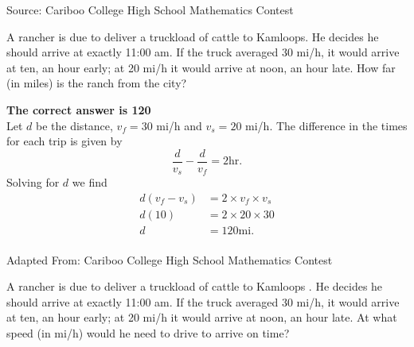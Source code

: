 \documentclass{article}
\begin{document}
\scriptsize
Source: Cariboo College High School Mathematics Contest

\normalsize
A rancher is due to deliver a truckload of cattle to Kamloops. He decides he should arrive at exactly 11:00 am. If the truck averaged 30 mi/h, it would arrive at ten, an hour early; at 20 mi/h it would arrive at noon, an hour late. How far (in miles) is the ranch from the city? 


\textbf{The correct answer is 120}\\[1 ex]
Let $d$ be the distance, $v_f=30$ mi/h and $v_s=20$ mi/h. The difference in the times for each trip is given by
\begin{equation*}
\frac{d}{v_s}-\frac{d}{v_f}=2\textrm{hr}.
\end{equation*}
Solving for $d$ we find
\begin{align*}
d(v_f-v_s)&=2\times v_f \times v_s\\
d(10)&=2\times20\times30\\
d&=120\textrm{mi}.
\end{align*}
\\[5 ex]

\scriptsize
Adapted From: Cariboo College High School Mathematics Contest

\normalsize
A rancher is due to deliver a truckload of cattle to Kamloops   . He decides he should arrive at exactly 11:00 am. If the truck averaged 30 mi/h, it would arrive at ten, an hour early; at 20 mi/h it would arrive at noon, an hour late. At what speed (in mi/h) would he need to drive to arrive on time? 

\end{document}
